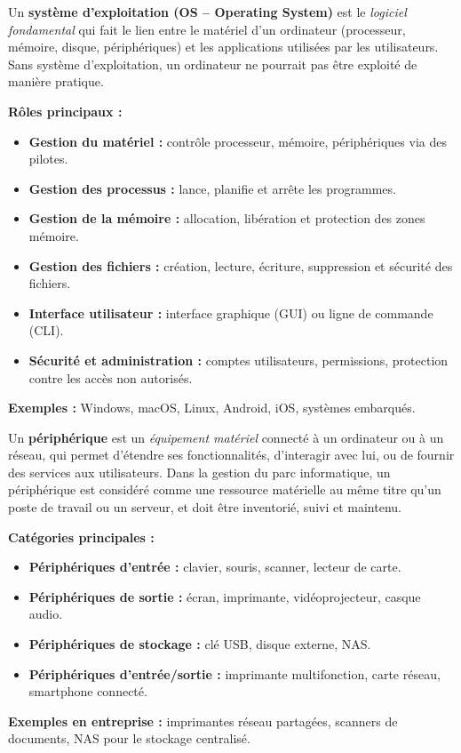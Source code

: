 \documentclass[a4paper,11pt]{article}
\begin{document}
\begin{tcolorbox}[colback=blue!5,colframe=blue!60!black,title=Qu'est-ce qu'un système d'exploitation ?]

Un \textbf{système d’exploitation (OS – Operating System)} est le \textit{logiciel fondamental} qui fait le lien entre 
le matériel d’un ordinateur (processeur, mémoire, disque, périphériques) et les applications utilisées par les utilisateurs.  
Sans système d’exploitation, un ordinateur ne pourrait pas être exploité de manière pratique.  

\medskip
\textbf{Rôles principaux :}
\begin{itemize}
  \item \textbf{Gestion du matériel :} contrôle processeur, mémoire, périphériques via des pilotes.
  \item \textbf{Gestion des processus :} lance, planifie et arrête les programmes.
  \item \textbf{Gestion de la mémoire :} allocation, libération et protection des zones mémoire.
  \item \textbf{Gestion des fichiers :} création, lecture, écriture, suppression et sécurité des fichiers.
  \item \textbf{Interface utilisateur :} interface graphique (GUI) ou ligne de commande (CLI).
  \item \textbf{Sécurité et administration :} comptes utilisateurs, permissions, protection contre les accès non autorisés.
\end{itemize}

\medskip
\textbf{Exemples :} Windows, macOS, Linux, Android, iOS, systèmes embarqués.
\end{tcolorbox}


\begin{tcolorbox}[colback=green!5,colframe=green!60!black,title=Qu'est-ce qu'un périphérique ?]

Un \textbf{périphérique} est un \textit{équipement matériel} connecté à un ordinateur ou à un réseau, 
qui permet d’étendre ses fonctionnalités, d’interagir avec lui, ou de fournir des services aux utilisateurs.  
Dans la gestion du parc informatique, un périphérique est considéré comme une ressource matérielle au même titre 
qu’un poste de travail ou un serveur, et doit être inventorié, suivi et maintenu.  

\medskip
\textbf{Catégories principales :}
\begin{itemize}
  \item \textbf{Périphériques d’entrée :} clavier, souris, scanner, lecteur de carte.
  \item \textbf{Périphériques de sortie :} écran, imprimante, vidéoprojecteur, casque audio.
  \item \textbf{Périphériques de stockage :} clé USB, disque externe, NAS.
  \item \textbf{Périphériques d’entrée/sortie :} imprimante multifonction, carte réseau, smartphone connecté.
\end{itemize}

\medskip
\textbf{Exemples en entreprise :} imprimantes réseau partagées, scanners de documents, NAS pour le stockage centralisé.
\end{tcolorbox}
\end{document}

